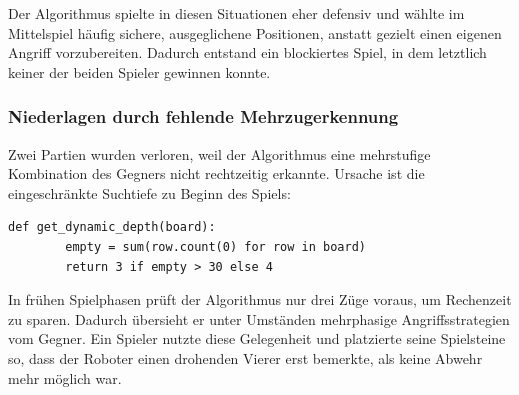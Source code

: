 Der Algorithmus spielte in diesen Situationen eher defensiv und wählte im Mittelspiel häufig sichere, ausgeglichene Positionen, anstatt gezielt einen eigenen Angriff vorzubereiten. Dadurch entstand ein blockiertes Spiel, in dem letztlich keiner der beiden Spieler gewinnen konnte.

\subsubsection*{Niederlagen durch fehlende Mehrzugerkennung}

Zwei Partien wurden verloren, weil der Algorithmus eine mehrstufige Kombination des Gegners nicht rechtzeitig erkannte. Ursache ist die eingeschränkte Suchtiefe zu Beginn des Spiels:
\begin{lstlisting}[style=pythonstyle]
	def get_dynamic_depth(board):
		empty = sum(row.count(0) for row in board)
		return 3 if empty > 30 else 4
\end{lstlisting}

In frühen Spielphasen prüft der Algorithmus nur drei Züge voraus, um Rechenzeit zu sparen. Dadurch übersieht er unter Umständen mehrphasige Angriffsstrategien vom Gegner. Ein Spieler nutzte diese Gelegenheit und platzierte seine Spielsteine so, dass der Roboter einen drohenden Vierer erst bemerkte, als keine Abwehr mehr möglich war.





